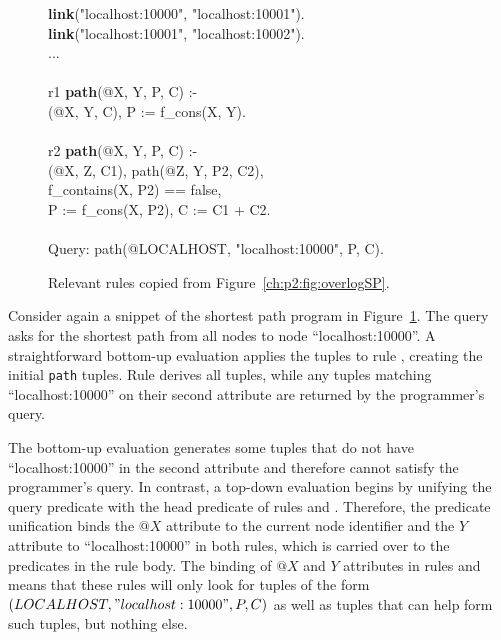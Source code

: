 {\begin{figure}[!t]
\ssp
\centering
\begin{boxedminipage}{\linewidth}
{\bf link}("localhost:10000", "localhost:10001").\\
{\bf link}("localhost:10001", "localhost:10002").\\
...\\
\\
r1 {\bf path}(@X, Y, P, C) :- \\
(@X, Y, C), P := f\_cons(X, Y). \\
\\
r2 {\bf path}(@X, Y, P, C) :- \\
(@X, Z, C1), path(@Z, Y, P2, C2),\\
\datalogspace f\_contains(X, P2) == false, \\
\datalogspace P := f\_cons(X, P2), C := C1 + C2. \\
\\
Query: path(@LOCALHOST, "localhost:10000", P, C).
\end{boxedminipage}
\caption{\label{ch:evita:fig:querySP}Relevant rules copied from Figure~\ref{ch:p2:fig:overlogSP}.}
\end{figure}

Consider again a snippet of the shortest path program in
Figure~\ref{ch:evita:fig:querySP}.  The query asks for the shortest path from
all nodes to node ``localhost:10000''.  A straightforward bottom-up evaluation
applies the  tuples to rule , creating the initial {\tt path}
tuples.  Rule  derives all  tuples, while any  tuples
matching ``localhost:10000'' on their second attribute are returned by the
programmer's query.

The bottom-up evaluation generates some  tuples that do not have
``localhost:10000'' in the second attribute and therefore cannot satisfy the
programmer's query.  In contrast, a top-down evaluation begins by unifying the
query predicate with the head predicate of rules  and .
Therefore, the  predicate unification binds the $@X$ attribute to the
current node identifier and the $Y$ attribute to ``localhost:10000'' in both
rules, which is carried over to the predicates in the rule body.  The binding
of $@X$ and $Y$ attributes in rules  and  means that these rules
will only look for tuples of the form
$(LOCALHOST,"localhost:10000",P,C)$ as well as tuples that can help
form such  tuples, but nothing else.

}
